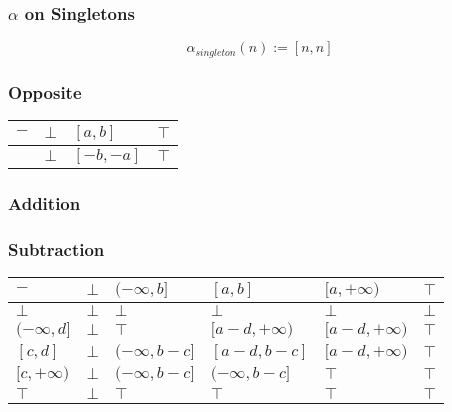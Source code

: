 \documentclass{beamer}
\begin{document}
                    \begin{frame}
                        \frametitle{\( \alpha \) on Singletons}
                        \[
                            \alpha_{singleton}(n) := [n, n]  
                        \]
                    \end{frame}
                    
                    
                    \begin{frame}
                        \frametitle{Opposite}
                        \begin{table}[]
                            \begin{tabular}{|l|l|l|l|}
                            \hline
                            $-$ & $\bot$ & $[a, b]$   & $\top$ \\ \hline
                                & $\bot$ & $[-b, -a]$ & $\top$ \\ \hline
                            \end{tabular}
                            \end{table}
                    \end{frame}

                    
        \begin{frame}
            \frametitle{Addition}
    \end{frame}
    
    
        \begin{frame}
            \frametitle{Subtraction}
        \begin{table}[]
            \begin{tabular}{|l|l|l|l|l|l|}
            \hline
            $-$            & $\bot$ & $(-\infty, b]$     & $[a, b]$           & $[a, +\infty)$     & $\top$ \\ \hline
            $\bot$         & $\bot$ & $\bot$             & $\bot$             & $\bot$             & $\bot$ \\ \hline
            $(-\infty, d]$ & $\bot$ & $\top$             & $[a - d, +\infty)$ & $[a - d, +\infty)$ & $\top$ \\ \hline
            $[c, d]$       & $\bot$ & $(-\infty, b - c]$ & $[a - d, b - c]$   & $[a - d, +\infty)$ & $\top$ \\ \hline
            $[c, +\infty)$ & $\bot$ & $(-\infty, b - c]$ & $(-\infty, b - c]$ & $\top$             & $\top$ \\ \hline
            $\top$         & $\bot$ & $\top$             & $\top$             & $\top$             & $\top$ \\ \hline
            \end{tabular}
            \end{table}
        \end{frame}
    
\end{document}

